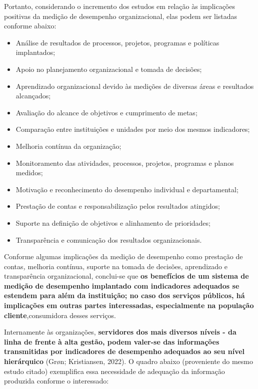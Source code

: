 \documentclass[
  letterpaper,
  DIV=11,
  numbers=noendperiod]{scrreprt}
\begin{document}
Portanto, considerando o incremento dos estudos em relação às
implicações positivas da medição de desempenho organizacional, elas
podem ser listadas conforme abaixo:

\begin{itemize}
\item
  Análise de resultados de processos, projetos, programas e políticas
  implantados;
\item
  Apoio no planejamento organizacional e tomada de decisões;
\item
  Aprendizado organizacional devido às medições de diversas áreas e
  resultados alcançados;
\item
  Avaliação do alcance de objetivos e cumprimento de metas;
\item
  Comparação entre instituições e unidades por meio dos mesmos
  indicadores;
\item
  Melhoria contínua da organização;
\item
  Monitoramento das atividades, processos, projetos, programas e planos
  medidos;
\item
  Motivação e reconhecimento do desempenho individual e departamental;
\item
  Prestação de contas e responsabilização pelos resultados atingidos;
\item
  Suporte na definição de objetivos e alinhamento de prioridades;
\item
  Transparência e comunicação dos resultados organizacionais.
\end{itemize}

Conforme algumas implicações da medição de desempenho como prestação de
contas\emph{,} melhoria contínua, suporte na tomada de decisões,
aprendizado e transparência organizacional, conclui-se que \textbf{os
benefícios de um sistema de medição de desempenho implantado com
indicadores adequados se estendem para além da instituição; no caso dos
serviços públicos, há implicações em outras partes interessadas,
especialmente na população cliente},consumidora desses serviços.

Internamente às organizações, \textbf{servidores dos mais diversos
níveis - da linha de frente à alta gestão, podem valer-se das
informações transmitidas por indicadores de desempenho adequados ao seu
nível hierárquico} (Grøn; Kristiansen, 2022). O quadro abaixo
(proveniente do mesmo estudo citado) exemplifica essa necessidade de
adequação da informação produzida conforme o interessado:
\end{document}
